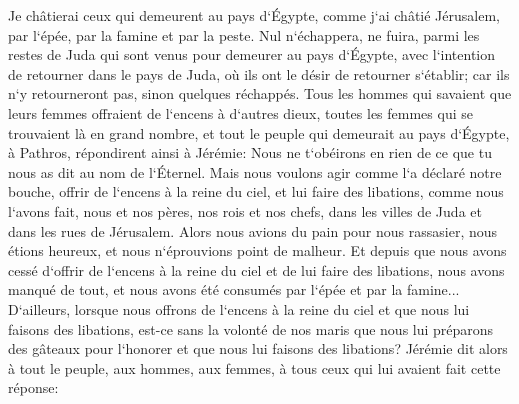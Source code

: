 \verse Je châtierai ceux qui demeurent au pays d`Égypte, comme j`ai châtié Jérusalem, par l`épée, par la famine et par la peste. 
\verse Nul n`échappera, ne fuira, parmi les restes de Juda qui sont venus pour demeurer au pays d`Égypte, avec l`intention de retourner dans le pays de Juda, où ils ont le désir de retourner s`établir; car ils n`y retourneront pas, sinon quelques réchappés. 
\verse Tous les hommes qui savaient que leurs femmes offraient de l`encens à d`autres dieux, toutes les femmes qui se trouvaient là en grand nombre, et tout le peuple qui demeurait au pays d`Égypte, à Pathros, répondirent ainsi à Jérémie: 
\verse Nous ne t`obéirons en rien de ce que tu nous as dit au nom de l`Éternel. 
\verse Mais nous voulons agir comme l`a déclaré notre bouche, offrir de l`encens à la reine du ciel, et lui faire des libations, comme nous l`avons fait, nous et nos pères, nos rois et nos chefs, dans les villes de Juda et dans les rues de Jérusalem. Alors nous avions du pain pour nous rassasier, nous étions heureux, et nous n`éprouvions point de malheur. 
\verse Et depuis que nous avons cessé d`offrir de l`encens à la reine du ciel et de lui faire des libations, nous avons manqué de tout, et nous avons été consumés par l`épée et par la famine... 
\verse D`ailleurs, lorsque nous offrons de l`encens à la reine du ciel et que nous lui faisons des libations, est-ce sans la volonté de nos maris que nous lui préparons des gâteaux pour l`honorer et que nous lui faisons des libations? 
\verse Jérémie dit alors à tout le peuple, aux hommes, aux femmes, à tous ceux qui lui avaient fait cette réponse: 
